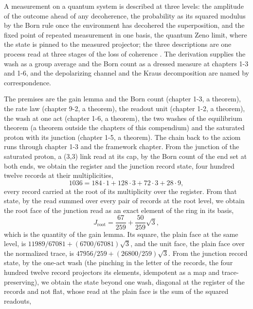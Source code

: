 \begin{chbridge}
A measurement on a quantum system is described at three levels: the amplitude of the outcome ahead of any decoherence, the probability as its squared modulus by the Born rule once the environment has decohered the superposition, and the fixed point of repeated measurement in one basis, the quantum Zeno limit, where the state is pinned to the measured projector; the three descriptions are one process read at three stages of the loss of coherence \cite{Born1926,Zurek2003,Misra1977}. The derivation supplies the wash as a group average and the Born count as a dressed measure at chapters 1-3 and 1-6, and the depolarizing channel and the Kraus decomposition are named by correspondence.
\end{chbridge}
\begin{chproof}[exact]
The premises are the gain lemma and the Born count (chapter 1-3, a theorem), the rate law (chapter 9-2, a theorem), the readout unit (chapter 1-2, a theorem), the wash at one act (chapter 1-6, a theorem), the two washes of the equilibrium theorem (a theorem outside the chapters of this compendium) and the saturated proton with its junction (chapter 1-5, a theorem). The chain back to the axiom runs through chapter 1-3 and the framework chapter. From the junction of the saturated proton, a (3,3) link read at its cap, by the Born count of the end set at both ends, we obtain the register and the junction record state, four hundred twelve records at their multiplicities,
\begin{equation}
1036 = 184\cdot 1 + 128\cdot 3 + 72\cdot 3 + 28\cdot 9 ,
\end{equation}
every record carried at the root of its multiplicity over the register. From that state, by the read summed over every pair of records at the root level, we obtain the root face of the junction read as an exact element of the ring in its basis,
\begin{equation}
J_{\mathrm{root}} = \frac{67}{259} + \frac{50}{259}\sqrt{3} ,
\end{equation}
which is the quantity of the gain lemma. Its square, the plain face at the same level, is $11989/67081 + (6700/67081)\sqrt{3}$, and the unit face, the plain face over the normalized trace, is $47956/259 + (26800/259)\sqrt{3}$. From the junction record state, by the one-act wash (the pinching in the letter of the records, the four hundred twelve record projectors its elements, idempotent as a map and trace-preserving), we obtain the state beyond one wash, diagonal at the register of the records and not flat, whose read at the plain face is the sum of the squared readouts,

\end{chproof}
